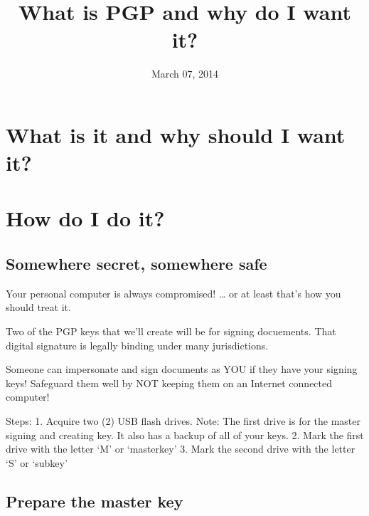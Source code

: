 \documentclass[11pt]{article}
\title{What is PGP and why do I want it?}
\date{March 07, 2014}
\begin{document}
\section*{What is it and why should I want it?}

\section*{How do I do it?}
\subsection*{Somewhere secret, somewhere safe}
Your personal computer is always compromised! … or at least that's how you should treat it.

Two of the PGP keys that we'll create will be for signing docuements. That digital signature is
legally binding under many jurisdictions.

Someone can impersonate and sign documents as YOU if they have your signing keys!
Safeguard them well by NOT keeping them on an Internet connected computer!

Steps:
1. Acquire two (2) USB flash drives.
Note: The first drive is for the master signing and creating key. It also has a backup of all of your keys.
2. Mark the first drive with the letter ‘M’ or ‘masterkey’
3. Mark the second drive with the letter ‘S’ or ‘subkey’
\subsection*{Prepare the master key}
\end{document}
